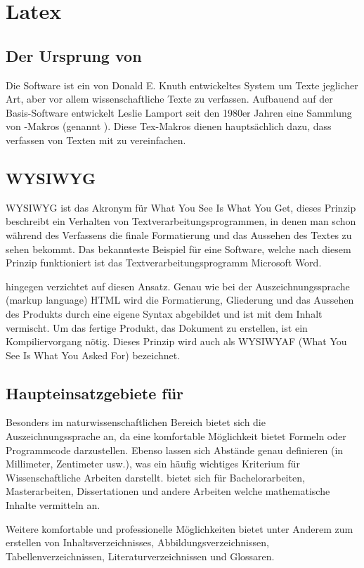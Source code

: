 \chapter{Latex}
    \section{Der Ursprung von \latex}
    Die Software \tex ist ein von Donald E. Knuth entwickeltes System um Texte jeglicher Art, aber vor allem wissenschaftliche Texte zu verfassen. Aufbauend auf der Basis-Software \tex entwickelt Leslie Lamport seit den 1980er Jahren eine Sammlung von \tex-Makros (genannt \latex). Diese Tex-Makros dienen hauptsächlich dazu, dass verfassen von Texten mit \tex zu vereinfachen.

    \section{WYSIWYG}
    WYSIWYG ist das Akronym für What You See Is What You Get, dieses Prinzip beschreibt ein Verhalten von Textverarbeitungsprogrammen, in denen man schon während des Verfassens die finale Formatierung und das Aussehen des Textes zu sehen bekommt. Das bekannteste Beispiel für eine Software, welche nach diesem Prinzip funktioniert ist das Textverarbeitungsprogramm Microsoft Word.

    \tex hingegen verzichtet auf diesen Ansatz. Genau wie bei der Auszeichnungssprache (markup language) HTML wird die Formatierung, Gliederung und das Aussehen des Produkts durch eine eigene Syntax abgebildet und ist mit dem Inhalt vermischt. Um das fertige Produkt, das Dokument zu erstellen, ist ein Kompiliervorgang nötig. Dieses Prinzip wird auch als WYSIWYAF (What You See Is What You Asked For) bezeichnet.

    \section{Haupteinsatzgebiete für \tex}
    Besonders im naturwissenschaftlichen Bereich bietet sich die Auszeichnungssprache \tex an, da \tex eine komfortable Möglichkeit bietet Formeln oder Programmcode darzustellen. Ebenso lassen sich Abstände genau definieren (in Millimeter, Zentimeter usw.), was ein häufig wichtiges Kriterium für Wissenschaftliche Arbeiten darstellt. \tex bietet sich für Bachelorarbeiten, Masterarbeiten, Dissertationen und andere Arbeiten welche mathematische Inhalte vermitteln an.

    Weitere komfortable und professionelle Möglichkeiten bietet \tex unter Anderem zum erstellen von Inhaltsverzeichnisses, Abbildungsverzeichnissen, Tabellenverzeichnissen, Literaturverzeichnissen und Glossaren.

